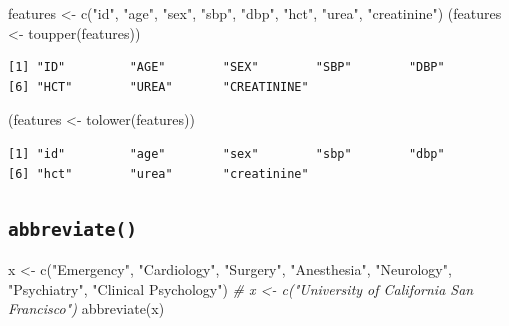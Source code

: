 \documentclass[
]{book}
\newenvironment{Shaded}{\begin{snugshade}}{\end{snugshade}}
\newcommand{\CommentTok}[1]{\textcolor[rgb]{0.56,0.35,0.01}{\textit{#1}}}
\newcommand{\FunctionTok}[1]{\textcolor[rgb]{0.00,0.00,0.00}{#1}}
\newcommand{\NormalTok}[1]{#1}
\newcommand{\OtherTok}[1]{\textcolor[rgb]{0.56,0.35,0.01}{#1}}
\newcommand{\StringTok}[1]{\textcolor[rgb]{0.31,0.60,0.02}{#1}}
\begin{document}
\begin{Shaded}
\begin{Highlighting}[]
\NormalTok{features }\OtherTok{\textless{}{-}} \FunctionTok{c}\NormalTok{(}\StringTok{"id"}\NormalTok{, }\StringTok{"age"}\NormalTok{, }\StringTok{"sex"}\NormalTok{, }\StringTok{"sbp"}\NormalTok{, }\StringTok{"dbp"}\NormalTok{, }\StringTok{"hct"}\NormalTok{, }\StringTok{"urea"}\NormalTok{, }\StringTok{"creatinine"}\NormalTok{)}
\NormalTok{(features }\OtherTok{\textless{}{-}} \FunctionTok{toupper}\NormalTok{(features))}
\end{Highlighting}
\end{Shaded}

\begin{verbatim}
[1] "ID"         "AGE"        "SEX"        "SBP"        "DBP"       
[6] "HCT"        "UREA"       "CREATININE"
\end{verbatim}

\begin{Shaded}
\begin{Highlighting}[]
\NormalTok{(features }\OtherTok{\textless{}{-}} \FunctionTok{tolower}\NormalTok{(features))}
\end{Highlighting}
\end{Shaded}

\begin{verbatim}
[1] "id"         "age"        "sex"        "sbp"        "dbp"       
[6] "hct"        "urea"       "creatinine"
\end{verbatim}

\hypertarget{abbreviate}{%
\subsection{\texorpdfstring{\texttt{abbreviate()}}{abbreviate()}}\label{abbreviate}}

\begin{Shaded}
\begin{Highlighting}[]
\NormalTok{x }\OtherTok{\textless{}{-}} \FunctionTok{c}\NormalTok{(}\StringTok{"Emergency"}\NormalTok{, }\StringTok{"Cardiology"}\NormalTok{, }\StringTok{"Surgery"}\NormalTok{, }\StringTok{"Anesthesia"}\NormalTok{, }\StringTok{"Neurology"}\NormalTok{, }\StringTok{"Psychiatry"}\NormalTok{, }\StringTok{"Clinical Psychology"}\NormalTok{)}
\CommentTok{\# x \textless{}{-} c("University of California San Francisco")}
\FunctionTok{abbreviate}\NormalTok{(x)}
\end{Highlighting}
\end{Shaded}
\end{document}
